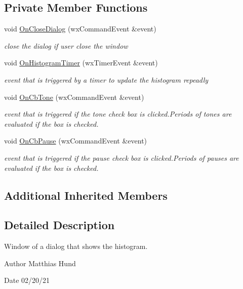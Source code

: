 \subsection*{Private Member Functions}
\begin{DoxyCompactItemize}
\item 
void \hyperlink{classHistogramDialog_a6a9c1ccefa792e8fdc0c3a846fecbe9b}{On\+Close\+Dialog} (wx\+Command\+Event \&event)
\begin{DoxyCompactList}\small\item\em close the dialog if user close the window \end{DoxyCompactList}\item 
void \hyperlink{classHistogramDialog_ac382ffacb7bbd761b95bb08b94517cb1}{On\+Histogram\+Timer} (wx\+Timer\+Event \&event)
\begin{DoxyCompactList}\small\item\em event that is triggered by a timer to update the histogram repeadly \end{DoxyCompactList}\item 
void \hyperlink{classHistogramDialog_a3212f57cc24b1f904ff3109820cae5c1}{On\+Cb\+Tone} (wx\+Command\+Event \&event)
\begin{DoxyCompactList}\small\item\em event that is triggered if the tone check box is clicked.\+Periods of tones are evaluated if the box is checked. \end{DoxyCompactList}\item 
void \hyperlink{classHistogramDialog_a52b28f05b31b490b10d6ed833ddff795}{On\+Cb\+Pause} (wx\+Command\+Event \&event)
\begin{DoxyCompactList}\small\item\em event that is triggered if the pause check box is clicked.\+Periods of pauses are evaluated if the box is checked. \end{DoxyCompactList}\end{DoxyCompactItemize}
\subsection*{Additional Inherited Members}


\subsection{Detailed Description}
Window of a dialog that shows the histogram. 

\begin{DoxyAuthor}{Author}
Matthias Hund 
\end{DoxyAuthor}
\begin{DoxyDate}{Date}
02/20/21 
\end{DoxyDate}


